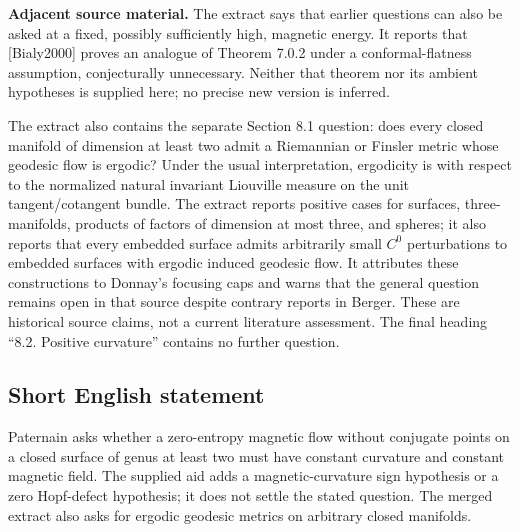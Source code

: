 \documentclass[11pt]{article}
\begin{document}
\textbf{Adjacent source material.} The extract says that earlier questions can also be asked at a fixed, possibly sufficiently high, magnetic energy. It reports that [Bialy2000] proves an analogue of Theorem 7.0.2 under a conformal-flatness assumption, conjecturally unnecessary. Neither that theorem nor its ambient hypotheses is supplied here; no precise new version is inferred.

The extract also contains the separate Section 8.1 question: does every closed manifold of dimension at least two admit a Riemannian or Finsler metric whose geodesic flow is ergodic? Under the usual interpretation, ergodicity is with respect to the normalized natural invariant Liouville measure on the unit tangent/cotangent bundle. The extract reports positive cases for surfaces, three-manifolds, products of factors of dimension at most three, and spheres; it also reports that every embedded surface admits arbitrarily small $C^0$ perturbations to embedded surfaces with ergodic induced geodesic flow. It attributes these constructions to Donnay's focusing caps and warns that the general question remains open in that source despite contrary reports in Berger. These are historical source claims, not a current literature assessment. The final heading ``8.2. Positive curvature'' contains no further question.
\subsection{Short English statement}
Paternain asks whether a zero-entropy magnetic flow without conjugate points on a closed surface of genus at least two must have constant curvature and constant magnetic field. The supplied aid adds a magnetic-curvature sign hypothesis or a zero Hopf-defect hypothesis; it does not settle the stated question. The merged extract also asks for ergodic geodesic metrics on arbitrary closed manifolds.
\end{document}

